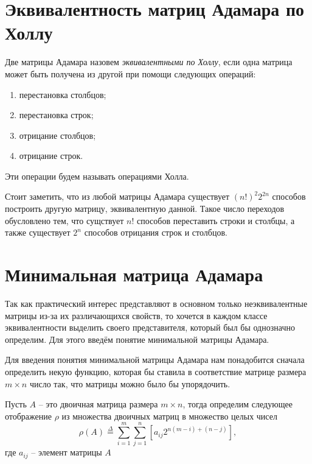 \section{Эквивалентность матриц Адамара по Холлу}

\begin{Df}\normalfont\label{df:had_eq}
    Две матрицы Адамара назовем {\it эквивалентными по Холлу}, если одна матрица может быть получена из другой при помощи следующих операций:
    \begin{enumerate}
        \item перестановка столбцов;
        \item перестановка строк;
        \item отрицание столбцов;
        \item отрицание строк.
    \end{enumerate}
    Эти операции будем называть операциями Холла. 
\end{Df}

Стоит заметить, что из любой матрицы Адамара существует $\left(n!\right)^2 2^{2n}$ способов построить другую матрицу, эквивалентную данной. Такое число переходов обусловлено тем, что сущствует $n!$ способов переставить строки и столбцы, а также существует $2^n$ способов отрицания строк и столбцов.

\section{Минимальная матрица Адамара}

Так как практический интерес представляют в основном только неэквивалентные матрицы из-за их различающихся свойств, то хочется в каждом классе эквивалентности выделить своего представителя, который был бы однозначно определим. Для этого введём понятие минимальной матрицы Адамара.

Для введения понятия минимальной матрицы Адамара нам понадобится сначала определить некую функцию, которая бы ставила в соответствие матрице размера $m \times n$ число так, что матрицы можно было бы упорядочить.

\begin{Df}\normalfont\label{df:bin_map}
    Пусть $A$ -- это двоичная матрица размера $m \times n$, тогда определим следующее отображение $\rho$ из множества двоичных матриц в множество целых чисел
    \begin{equation}
        \rho(A) \overset{\Delta}{=} \sum_{i = 1}^m \sum_{j = 1}^n \left[a_{ij} 2^{n(m-i)+(n-j)}\right],
    \end{equation}
    где $a_{ij}$ -- элемент матрицы $A$
\end{Df}

